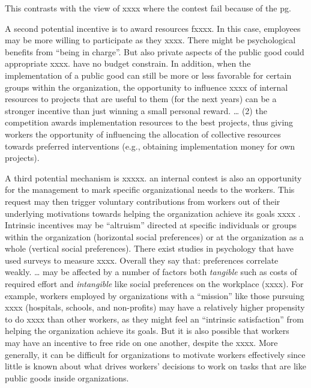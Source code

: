 \documentclass[12pt, titlepage]{article}
\begin{document}
This contrasts with the view of xxxx where the contest fail because of
the pg.

A second potential incentive is to award resources fxxxx. In this case,
employees may be more willing to participate as they xxxx. There might
be psychological benefits from ``being in charge''. But also private
aspects of the public good could appropriate xxxx. have no budget
constrain. In addition, when the implementation of a public good can
still be more or less favorable for certain groups within the
organization, the opportunity to influence xxxx of internal resources to
projects that are useful to them (for the next years) can be a stronger
incentive than just winning a small personal reward. \ldots{} (2) the
competition awards implementation resources to the best projects, thus
giving workers the opportunity of influencing the allocation of
collective resources towards preferred interventions (e.g., obtaining
implementation money for own projects).

A third potential mechanism is xxxxx. an internal contest is also an
opportunity for the management to mark specific organizational needs to
the workers. This request may then trigger voluntary contributions from
workers out of their underlying motivations towards helping the
organization achieve its goals xxxx
\citep{besley2005competition, rotemberg2006altruism}. Intrinsic
incentives may be ``altruism'' directed at specific individuals or
groups within the organization (horizontal social preferences) or at the
organization as a whole (vertical social preferences). There exist
studies in psychology that have used surveys to measure xxxx. Overall
they say that: preferences correlate weakly. \ldots{} may be affected by
a number of factors both \emph{tangible} such as costs of required
effort and \emph{intangible} like social preferences on the workplace
(xxxx). For example, workers employed by organizations with a
``mission'' like those pursuing xxxx (hospitals, schools, and
non-profits) may have a relatively higher propensity to do xxxx than
other workers, as they might feel an ``intrinsic satisfaction'' from
helping the organization achieve its goals. But it is also possible that
workers may have an incentive to free ride on one another, despite the
xxxx. More generally, it can be difficult for organizations to motivate
workers effectively since little is known about what drives workers'
decisions to work on tasks that are like public goods inside
organizations.
\end{document}
